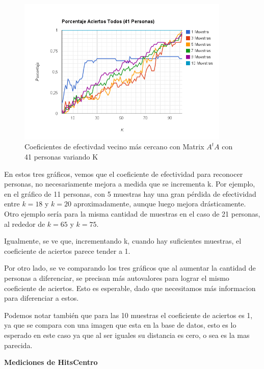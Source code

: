 \begin{figure}[H] \includegraphics[width=0.90\textwidth]{img/image12.png} \caption{Coeficientes de
    efectivdad vecino más cercano con Matrix $A^tA$ con 41 personas variando K} \end{figure}

En estos tres gr\'aficos, vemos que el coeficiente de efectividad para reconocer personas, no
necesariamente mejora a medida que se incrementa k. Por ejemplo, en el gr\'afico de 11 personas, con
5 muestras hay una gran p\'erdida de efectividad entre $k=18$ y $k=20$ aproximadamente, aunque luego
mejora dr\'asticamente. Otro ejemplo ser\'ia para la misma cantidad de muestras en el caso de 21
personas, al rededor de $k=65$ y $k=75$.

Igualmente, se ve que, incrementando k, cuando hay suficientes muestras, el coeficiente de aciertos
parece tender a 1.

Por otro lado, se ve comparando los tres gr\'aficos que al aumentar la cantidad de personas a
diferenciar, se precisan m\'as autovalores para lograr el mismo coeficiente de aciertos. Esto es
esperable, dado que necesitamos m\'as informacion para diferenciar a estos.

Podemos notar tambi\'en que para las 10 muestras el coeficiente de aciertos es 1, ya que se compara
con una imagen que esta en la base de datos, esto es lo esperado en este caso ya que al ser iguales
su distancia es cero, o sea es la mas parecida.

\textbf{Mediciones de HitsCentro }

